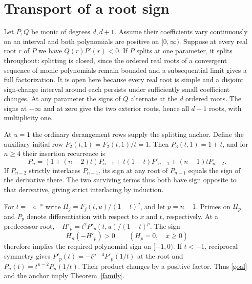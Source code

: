 \documentclass[11pt]{article}
\begin{document}
\section{Transport of a root sign}\label{transport}
Let \(P,Q\) be monic of degrees \(d,d+1\). Assume their coefficients vary continuously on an interval and both polynomials are positive on \([0,\infty)\). Suppose at every real root \(r\) of \(P\) we have \(Q(r)P'(r)<0\). If \(P\) splits at one parameter, it splits throughout: splitting is closed, since the ordered real roots of a convergent sequence of monic polynomials remain bounded and a subsequential limit gives a full factorization. It is open here because every real root is simple and a disjoint sign-change interval around each persists under sufficiently small coefficient changes. At any parameter the signs of \(Q\) alternate at the \(d\) ordered roots. The signs at \(-\infty\) and at zero give the two exterior roots, hence all \(d+1\) roots, with multiplicity one.

At \(u=1\) the ordinary derangement rows supply the splitting anchor. Define the auxiliary initial row \(P_2(t,1)=F_2(t,1)/t=1\). Then \(P_3(t,1)=1+t\), and for \(n\ge4\) their insertion recurrence is
\[
 P_n=(1+(n-2)t)P_{n-1}+t(1-t)P'_{n-1}+(n-1)tP_{n-2}.
\]
If \(P_{n-2}\) strictly interlaces \(P_{n-1}\), its sign at any root of \(P_{n-1}\) equals the sign of the derivative there. The two surviving terms thus both have sign opposite to that derivative, giving strict interlacing by induction.

For \(t=-e^{-x}\) write \(H_j=F_j(t,u)/(1-t)^j\), and let \(p=n-1\). Primes on \(H_p\) and \(P_p\) denote differentiation with respect to \(x\) and \(t\), respectively. At a predecessor root, \(-H'_p=t^2P'_p(t,u)/(1-t)^p\). The sign
\begin{equation}\label{goal}
 H_n(-H'_p)>0\qquad(H_p=0,\quad x\ge0)
\end{equation}
therefore implies the required polynomial sign on \([-1,0)\). If \(t<-1\), reciprocal symmetry gives \(P'_p(t)=-t^{p-4}P'_p(1/t)\) at the root and \(P_n(t)=t^{n-2}P_n(1/t)\). Their product changes by a positive factor. Thus \eqref{goal} and the anchor imply Theorem~\ref{family}.
\end{document}
